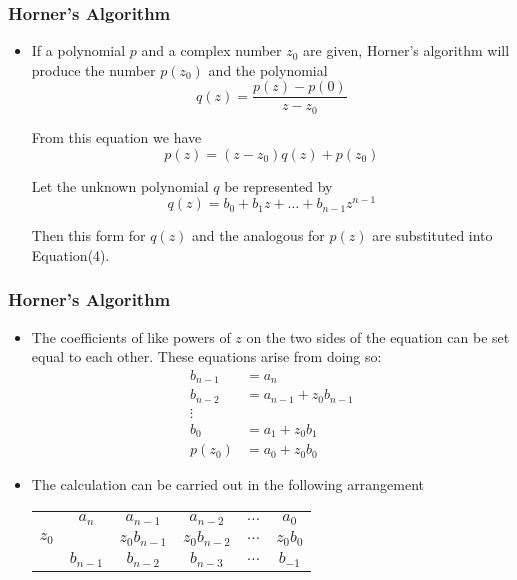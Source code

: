 \documentclass[notheorems,mathserif,table,compress]{beamer}  %
\begin{document}
\begin{frame}
\frametitle{Horner's Algorithm}
\begin{itemize}
\item If a polynomial $p$ and a complex number $z_0$ are given, Horner's algorithm will produce the number $p(z_0)$ and the polynomial 
\begin{displaymath}
q(z)=\frac{p(z)-p(0)}{z-z_0}
\end{displaymath}

From this equation we have
\begin{equation}
p(z)=(z-z_0)q(z)+p(z_0)
\end{equation}

Let the unknown polynomial $q$ be represented by
\begin{displaymath}
q(z)=b_0+b_1 z+\ldots+b_{n-1} z^{n-1}
\end{displaymath}

Then  this form for $q(z)$ and the analogous for $p(z)$ are substituted into Equation(4).
\end{itemize}
\end{frame}

\begin{frame}
\frametitle{Horner's Algorithm}
\begin{itemize}
\item The coefficients of like powers of $z$ on the two sides of the equation can be set equal to each other.
These equations arise from doing so:
\begin{equation*}
\begin{split}
b_{n-1} & = a_n\\
b_{n-2} & = a_{n-1}+z_0 b_{n-1}\\
\vdots \\
    b_0 & = a_1+z_0 b_1\\
 p(z_0) & = a_0+z_0 b_0
\end{split}
\end{equation*}

\end{itemize}
\begin{itemize}
\item The calculation can be carried out in the following arrangement
\begin{tabular}{r|c c c c c}
      & $a_n$ & $a_{n-1}$ & $a_{n-2}$ & $\ldots$ & $a_0$\\
$z_0$ &       & $z_0 b_{n-1}$ & $z_0 b_{n-2}$ & $\ldots$ & $z_0 b_0$\\
\hline
      & $b_{n-1}$ & $b_{n-2}$ & $b_{n-3}$ & $\ldots$ & $b_{-1}$
\end{tabular}

\end{itemize}
\end{frame}
\end{document}
